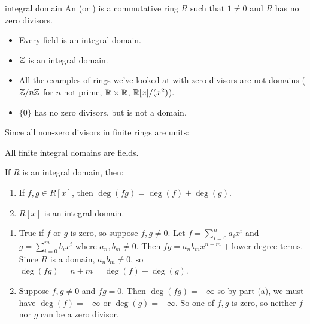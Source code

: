 \documentclass[12pt,letterpaper]{report}
\begin{document}
\begin{defn}{integral domain}{}
  An  (or ) is a commutative ring $R$ such that $1 \neq 0$
  and $R$ has no zero divisors.
\end{defn}

\begin{ex}
  \begin{itemize}
    \item Every field is an integral domain.
    \item $\mathbb{Z}$ is an integral domain.
    \item All the examples of rings we've looked at with zero divisors are not domains
      ($\mathbb{Z}/{n}\mathbb{Z}$ for $n$ not prime, $\mathbb{R} \times \mathbb{R}$, $\mathbb{R}[x]/(x^2)$).
    \item $\{0\}$ has no zero divisors, but is not a domain.
  \end{itemize}
\end{ex}

Since all non-zero divisors in finite rings are units:

\begin{cor}{}{}
  All finite integral domains are fields.
\end{cor}

\begin{prop}{}{}
  If $R$ is an integral domain, then:
  \begin{enumerate}
    \item If $f, g \in R[x]$, then $\deg(fg) = \deg(f) + \deg(g)$.
    \item $R[x]$ is an integral domain.
  \end{enumerate}
\end{prop}

\begin{thmproof}
  \begin{enumerate}
    \item True if $f$ or $g$ is zero, so suppose $f, g \neq 0$.
    Let $f = \sum_{i = 0}^n a_i x^i$ and $g = \sum_{i = 0}^m b_i x^i$ where $a_n, b_m \neq 0$.
    Then $fg = a_n b_m x^{n + m} + \text{lower degree terms}$.
    Since $R$ is a domain, $a_n b_m \neq 0$, so $\deg(fg) = n + m = \deg(f) + \deg(g)$.
    \item Suppose $f, g \neq 0$ and $fg = 0$.
    Then $\deg(fg) = -\infty$ so by part (a), we must have $\deg(f) = -\infty$ or
    $\deg(g) = -\infty$.
    So one of $f, g$ is zero, so neither $f$ nor $g$ can be a zero divisor.
  \end{enumerate}
\end{thmproof}
\end{document}
